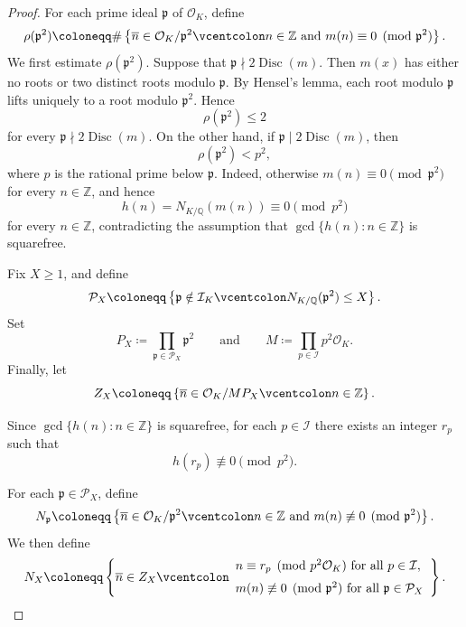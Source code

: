 \documentclass[11pt]{amsart}
\numberwithin{equation}{section}
\theoremstyle{definition}
\begin{document}
\begin{proof}
    For each prime ideal $\mathfrak{p}$ of $\mathcal{O}_K$, define
    \[
        \rho(\mathfrak{p}^2) \coloneqq \#\left\{\overline{n}\in\mathcal{O}_K/\mathfrak{p}^2
        \vcentcolon n\in\mathbb{Z} \text{ and } m(n)\equiv 0\pmod{\mathfrak{p}^2}\right\}.
    \]
    We first estimate $\rho(\mathfrak{p}^2)$. Suppose that
    $\mathfrak{p}\nmid 2\operatorname{Disc}(m)$. Then $m(x)$ has either no roots or two distinct roots modulo $\mathfrak{p}$. By Hensel's lemma, each root modulo $\mathfrak{p}$ lifts uniquely to a root modulo $\mathfrak{p}^2$. Hence
    \[
        \rho(\mathfrak{p}^2)\leq 2 
    \]
    for every $\mathfrak{p}\nmid 2\operatorname{Disc}(m)$. On the other hand, if
    $\mathfrak{p}\mid 2\operatorname{Disc}(m)$, then
    \[
        \rho(\mathfrak{p}^2)<p^2,
    \]
    where $p$ is the rational prime below $\mathfrak{p}$. Indeed, otherwise $m(n)\equiv0\pmod{\mathfrak{p}^2}$ for every $n\in\mathbb{Z}$, and hence
    \[
        h(n) = N_{K/\mathbb{Q}}(m(n)) \equiv0\pmod{p^2}
    \]
    for every $n\in\mathbb{Z}$, contradicting the assumption that $\gcd\{h(n):n\in\mathbb{Z}\}$ is squarefree.
    
    Fix $X\geq1$, and define
    \[
        \mathcal{P}_X \coloneqq \left\{\mathfrak{p}\notin\mathcal{I}_K \vcentcolon N_{K/\mathbb{Q}}(\mathfrak{p}^2)\leq X \right\}.
    \]
    Set
    \[ 
        P_X\coloneqq \prod_{\mathfrak{p}\in\mathcal{P}_X}\mathfrak{p}^2
        \qquad\text{and}\qquad M\coloneqq \prod_{p\in\mathcal{I}}p^2\mathcal{O}_K.
    \]
    Finally, let
    \[
        Z_X \coloneqq \left\{\overline{n}\in\mathcal{O}_K/MP_X \vcentcolon n\in\mathbb{Z}\right\}.
    \]
    
    Since $\gcd\{h(n):n\in\mathbb{Z}\}$ is squarefree, for each $p\in\mathcal{I}$ there exists an integer $r_p$ such that
    \[
        h(r_p)\not\equiv0\pmod{p^2}.
    \]
    
    For each $\mathfrak{p}\in\mathcal{P}_X$, define
    \[
        N_{\mathfrak{p}} \coloneqq \left\{\overline{n}\in\mathcal{O}_K/\mathfrak{p}^2 \vcentcolon n\in\mathbb{Z} \text{ and } m(n)\not\equiv0\pmod{\mathfrak{p}^2}\right\}.
    \]
    We then define
    \[
        N_X \coloneqq \left\{\overline{n}\in Z_X \vcentcolon
        \begin{array}{l}
            n\equiv r_p\pmod{p^2\mathcal{O}_K}
            \text{ for all }p\in\mathcal{I},\\[2mm]
            m(n)\not\equiv0\pmod{\mathfrak{p}^2}
            \text{ for all }\mathfrak{p}\in\mathcal{P}_X
        \end{array}
        \right\}.
    \]
    

\end{proof}
\end{document}
